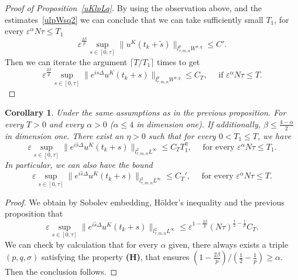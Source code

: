 \documentclass[10pt,a4paper]{article}
\newtheorem{corollary}[theorem]{Corollary}
\begin{document}
\begin{proof}[Proof of Proposition~\ref{uKlpLq}]
    By using the observation above, and the estimates~\eqref{ulpWsq2} 
    we can conclude that we can take sufficiently small \(T_1\), for every
    \(\varepsilon^\alpha N\tau \leq T_1\) 
    \[ \varepsilon^{\frac{2\beta}p} \sup_{s\in[0,\tau]} \|u^K(t_k+\tilde{s})\|_{l^p_{\tau,m,n}W^{\sigma,q}} \leq C'.\]
    Then we can iterate the argument \( \lceil T/T_1 \rceil \) times to get
    \[ \varepsilon^{\frac{2\beta}p} \sup_{s\in[0,\tau]} \|e^{i\hat{s}\Delta}u^K(t_k+s)\|_{l^p_{\tau,m,n}W^{\sigma,q}}
      \leq C_T,\quad \text{ if } \varepsilon^\alpha N\tau \leq T. \]
  \end{proof}
  
  \begin{corollary}\label{uKl2Linfty}
    Under the same assumptions as in the previous proposition.
    For every \(T>0\)
    and every \(\alpha > 0\) (\(\alpha\leq4\) in dimension one). If 
    additionally, \(\beta\leq\frac{4-\alpha}2\) in dimension one. There exist
    an \(\eta>0\) such that for every \(0< T_1 \leq T\), we have 
    \[ \varepsilon \sup_{s\in[0,\tau]} \|e^{i\hat{s}\Delta}u^K(t_k+s)\|_{l^2_{\tau,m,n}L^\infty} 
    \leq C_T T_1^\eta, \quad \text{ for every } \varepsilon^\alpha N \tau \leq T_1. \]
    In particular, we can also have the bound 
    \[ \varepsilon \sup_{s\in[0,\tau]} \|e^{i\hat{s}\Delta}u^K(t_k+s)\|_{l^2_{\tau,m,n}L^\infty} 
    \leq C_T', \quad \text{ for every } \varepsilon^\alpha N \tau \leq T. \]
  \end{corollary}

  \begin{proof}
    We obtain by Sobolev embedding, H\"older's inequality and the previous
    proposition that 
    \[ \varepsilon \sup_{s\in[0,\tau]} \|e^{i\hat{s}\Delta}u^K(t_k+s)\|_{l^2_{\tau,m,n}L^\infty}
    \leq \varepsilon^{1-\frac{2\beta}p} (N\tau)^{\frac12-\frac1p} C_T. \]
    We can check by calculation that for every \(\alpha\) given, there 
    always exists a triple \((p,q,\sigma)\) satisfying the property {\bf (H)}, 
    that ensures \((1-\frac{2\beta}p)/(\frac12-\frac1p) \geq \alpha\). Then the
    conclusion follows.
  \end{proof}
  
\end{document}
